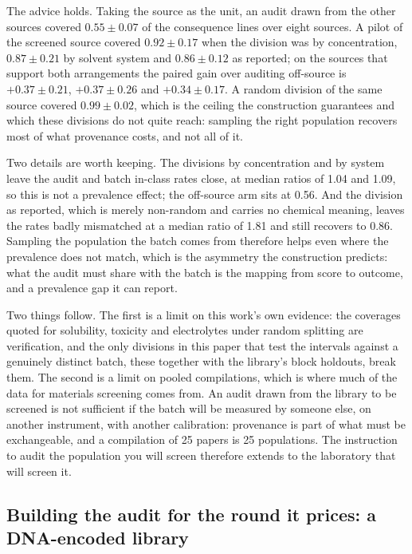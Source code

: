 \documentclass[twocolumn,10pt]{article}
\begin{document}
The advice holds. Taking the source as the unit, an audit drawn from the other sources covered
$0.55\pm0.07$ of the consequence lines over eight sources. A pilot of the screened source
covered $0.92\pm0.17$ when the division was by concentration, $0.87\pm0.21$ by solvent system
and $0.86\pm0.12$ as reported; on the sources that support both arrangements the paired gain
over auditing off-source is $+0.37\pm0.21$, $+0.37\pm0.26$ and $+0.34\pm0.17$. A random
division of the same source covered $0.99\pm0.02$, which is the ceiling the construction
guarantees and which these divisions do not quite reach: sampling the right population
recovers most of what provenance costs, and not all of it.

Two details are worth keeping. The divisions by concentration and by system leave the audit and
batch in-class rates close, at median ratios of 1.04 and 1.09, so this is not a prevalence
effect; the off-source arm sits at 0.56. And the division as reported, which is merely non-random and carries no chemical meaning, leaves the rates badly mismatched at a median ratio of 1.81
and still recovers to $0.86$. Sampling the population the batch comes from therefore helps even
where the prevalence does not match, which is the asymmetry the construction predicts: what the
audit must share with the batch is the mapping from score to outcome, and a prevalence gap it
can report.

Two things follow. The first is a limit on this work's own evidence: the coverages quoted
for solubility, toxicity and electrolytes under random splitting are verification, and the
only divisions in this paper that test the intervals against a genuinely distinct batch, these together with the library's block holdouts, break them. The second is a limit on pooled
compilations, which is where much of the data for materials screening comes from. An audit
drawn from the library to be screened is not sufficient if the batch will be measured by
someone else, on another instrument, with another calibration: provenance is part of what
must be exchangeable, and a compilation of 25 papers is 25 populations. The instruction to
audit the population you will screen therefore extends to the laboratory that will screen it.

\subsection{Building the audit for the round it prices: a DNA-encoded library}
\label{sec:results:del}
\end{document}
